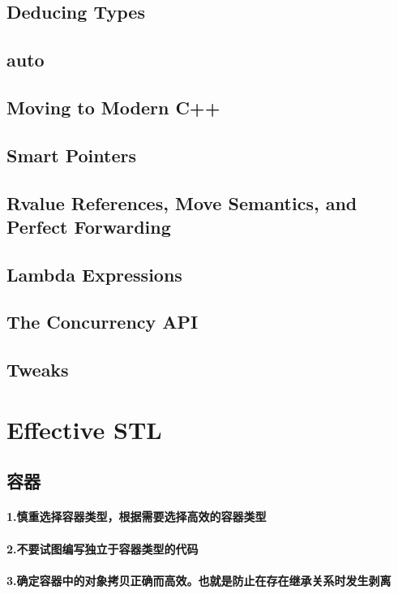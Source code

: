 \documentclass[UTF8,a4paper,12pt]{ctexbook}
\begin{document}
		\subsection{Deducing Types}
		\subsection{auto}
		\subsection{Moving to Modern C++}
		\subsection{Smart Pointers}
		\subsection{Rvalue References, Move Semantics, and Perfect Forwarding}
		\subsection{Lambda Expressions}
		\subsection{The Concurrency API}
		\subsection{Tweaks}
	\section{Effective STL}
		\subsection{容器}
			\paragraph{1.慎重选择容器类型，根据需要选择高效的容器类型}
			\paragraph{2.不要试图编写独立于容器类型的代码}
			\paragraph{3.确定容器中的对象拷贝正确而高效。也就是防止在存在继承关系时发生剥离}
\end{document}
